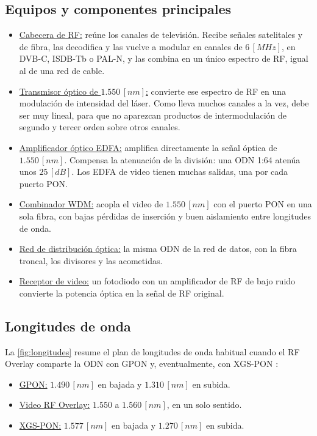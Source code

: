 \subsection{Equipos y componentes principales}
\begin{itemize}
    \item \underline{Cabecera de RF:} reúne los canales de televisión. Recibe señales satelitales y de fibra, las decodifica y las vuelve a modular en canales de $6 \, [MHz]$, en DVB-C, ISDB-Tb o PAL-N, y las combina en un único espectro de RF, igual al de una red de cable.
    \item \underline{Transmisor óptico de $1.550 \, [nm]$:} convierte ese espectro de RF en una modulación de intensidad del láser. Como lleva muchos canales a la vez, debe ser muy lineal, para que no aparezcan productos de intermodulación de segundo y tercer orden sobre otros canales.
    \item \underline{Amplificador óptico EDFA:} amplifica directamente la señal óptica de $1.550 \, [nm]$. Compensa la atenuación de la división: una ODN 1:64 atenúa unos $25 \, [dB]$. Los EDFA de video tienen muchas salidas, una por cada puerto PON.
    \item \underline{Combinador WDM:} acopla el video de $1.550 \, [nm]$ con el puerto PON en una sola fibra, con bajas pérdidas de inserción y buen aislamiento entre longitudes de onda.
    \item \underline{Red de distribución óptica:} la misma ODN de la red de datos, con la fibra troncal, los divisores y las acometidas.
    \item \underline{Receptor de video:} un fotodiodo con un amplificador de RF de bajo ruido convierte la potencia óptica en la señal de RF original.
\end{itemize}

\subsection{Longitudes de onda}
La \autoref{fig:longitudes} resume el plan de longitudes de onda habitual cuando el RF Overlay comparte la ODN con GPON y, eventualmente, con XGS-PON \cite{itu_g9845, itu_g98071}:
\begin{itemize}
    \item \underline{GPON:} $1.490 \, [nm]$ en bajada y $1.310 \, [nm]$ en subida.
    \item \underline{Video RF Overlay:} $1.550$ a $1.560 \, [nm]$, en un solo sentido.
    \item \underline{XGS-PON:} $1.577 \, [nm]$ en bajada y $1.270 \, [nm]$ en subida.
\end{itemize}

